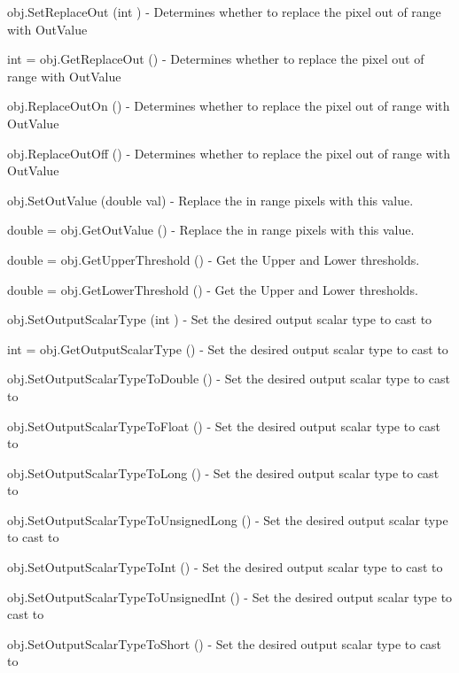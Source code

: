 \begin{DoxyItemize}
\item {\ttfamily obj.\-Set\-Replace\-Out (int )} -\/ Determines whether to replace the pixel out of range with Out\-Value  
\item {\ttfamily int = obj.\-Get\-Replace\-Out ()} -\/ Determines whether to replace the pixel out of range with Out\-Value  
\item {\ttfamily obj.\-Replace\-Out\-On ()} -\/ Determines whether to replace the pixel out of range with Out\-Value  
\item {\ttfamily obj.\-Replace\-Out\-Off ()} -\/ Determines whether to replace the pixel out of range with Out\-Value  
\item {\ttfamily obj.\-Set\-Out\-Value (double val)} -\/ Replace the in range pixels with this value.  
\item {\ttfamily double = obj.\-Get\-Out\-Value ()} -\/ Replace the in range pixels with this value.  
\item {\ttfamily double = obj.\-Get\-Upper\-Threshold ()} -\/ Get the Upper and Lower thresholds.  
\item {\ttfamily double = obj.\-Get\-Lower\-Threshold ()} -\/ Get the Upper and Lower thresholds.  
\item {\ttfamily obj.\-Set\-Output\-Scalar\-Type (int )} -\/ Set the desired output scalar type to cast to  
\item {\ttfamily int = obj.\-Get\-Output\-Scalar\-Type ()} -\/ Set the desired output scalar type to cast to  
\item {\ttfamily obj.\-Set\-Output\-Scalar\-Type\-To\-Double ()} -\/ Set the desired output scalar type to cast to  
\item {\ttfamily obj.\-Set\-Output\-Scalar\-Type\-To\-Float ()} -\/ Set the desired output scalar type to cast to  
\item {\ttfamily obj.\-Set\-Output\-Scalar\-Type\-To\-Long ()} -\/ Set the desired output scalar type to cast to  
\item {\ttfamily obj.\-Set\-Output\-Scalar\-Type\-To\-Unsigned\-Long ()} -\/ Set the desired output scalar type to cast to  
\item {\ttfamily obj.\-Set\-Output\-Scalar\-Type\-To\-Int ()} -\/ Set the desired output scalar type to cast to  
\item {\ttfamily obj.\-Set\-Output\-Scalar\-Type\-To\-Unsigned\-Int ()} -\/ Set the desired output scalar type to cast to  
\item {\ttfamily obj.\-Set\-Output\-Scalar\-Type\-To\-Short ()} -\/ Set the desired output scalar type to cast to  

\end{DoxyItemize}
